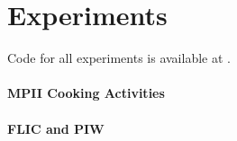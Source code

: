 \documentclass[runningheads]{llncs}
\begin{document}
\section{Experiments}


Code for all experiments is available at .

\paragraph{MPII Cooking Activities}



\paragraph{FLIC and PIW}


\end{document}
